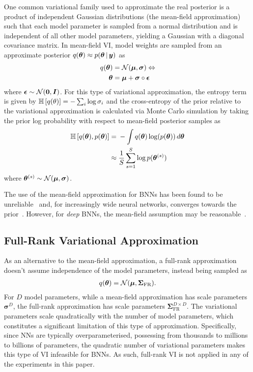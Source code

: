 One common variational family used to approximate the real posterior is a product of independent Gaussian distributions (the mean-field approximation) such that each model parameter is sampled from a normal distribution and is independent of all other model parameters, yielding a Gaussian with a diagonal covariance matrix.
In mean-field VI, model weights are sampled from an approximate posterior \(q(\bm \theta) \approx p(\bm{\theta} \, | \, \bm y)\) as
\begin{align}
    q(\bm \theta) ={} & \mathcal{N}(\bm \mu, \bm \sigma) \Leftrightarrow \nonumber         \\
    \bm{\theta} ={}   & \bm{\mu} + \bm{\sigma} \circ \bm{\epsilon}\label{eq:meanfield}
\end{align}
where \(\bm{\epsilon} \sim \mathcal{N}(\bm 0, \bm{I})\).
For this type of variational approximation, the entropy term is given by \(\mathbb{H}\left[q(\theta)\right] = - \sum_i \log \sigma_i\) and the cross-entropy of the prior relative to the variational approximation is calculated via Monte Carlo simulation by taking the prior log probability with respect to mean-field posterior samples as
\begin{align}
    \mathbb{H}\left[q(\bm\theta), p(\bm\theta)\right] ={} & - \int q(\bm\theta) \log(p(\bm\theta))\,d\bm\theta \nonumber \\
    \approx{}                                     & \frac{1}{S} \sum^S_{s=1} \log p(\bm{\theta}^{(s)})
\end{align}
where \(\bm{\theta}^{(s)} \sim \mathcal{N}(\bm{\mu}, \bm{\sigma})\).

The use of the mean-field approximation for BNNs has been found to be unreliable~\cite{wu2018deterministic} and, for increasingly wide neural networks, converges towards the prior~\cite{coker2021wide}.
However, for \emph{deep} BNNs, the mean-field assumption may be reasonable~\cite{farquhar2020liberty}.

\subsection{Full-Rank Variational Approximation}

As an alternative to the mean-field approximation, a full-rank approximation doesn't assume independence of the model parameters, instead being sampled as
\begin{align}\label{eq:fullrank}
    q(\bm \theta) = \mathcal{N}(\bm \mu, \bm \Sigma_{\mathrm{FR}}).
\end{align}
For \(D\) model parameters, while a mean-field approximation has scale parameters \(\bm \sigma^D\), the full-rank approximation has scale parameters \(\bm \Sigma_{\mathrm{FR}}^{D \times D}\).
The variational parameters scale quadratically with the number of model parameters, which constitutes a significant limitation of this type of approximation.
Specifically, since NNs are typically overparameterised, possessing from thousands to millions to billions of parameters, the quadratic number of variational parameters makes this type of VI infeasible for BNNs.
As such, full-rank VI is not applied in any of the experiments in this paper.

